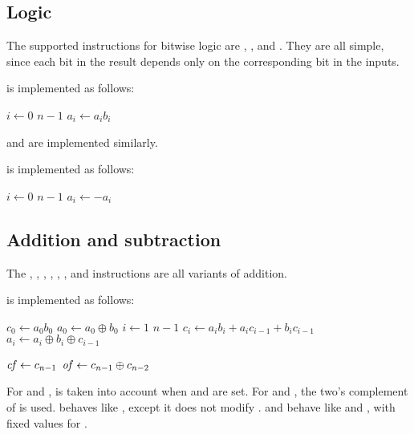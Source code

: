 \documentclass[a4paper,11pt]{kth-mag}
\renewcommand{\gets}{\leftarrow}
\newcommand{\AND}{}
\newcommand{\IOR}{+}
\newcommand{\XOR}{\oplus}
\newcommand{\NOT}{-}
\begin{document}

\subsection{Logic}

The supported instructions for bitwise logic are , ,  and .
They are all simple, since each bit in the result depends only on the corresponding bit in the inputs.

 is implemented as follows:

\begin{codebox}
\zi \For $i \gets 0$ \To $n-1$
\zi \Do
      $a_i \gets a_i \AND b_i$
    \End
\end{codebox}

 and  are implemented similarly.

 is implemented as follows:

\begin{codebox}
\zi \For $i \gets 0$ \To $n-1$
\zi \Do
      $a_i \gets \NOT a_i$
    \End
\end{codebox}

\subsection{Addition and subtraction}

The , , , , , ,  and  instructions are all variants of addition.

 is implemented as follows:

\begin{codebox}
\zi $c_0 \gets a_0 \AND b_0$
\zi $a_0 \gets a_0 \XOR b_0$
\zi \For $i \gets 1$ \To $n-1$
\zi \Do
      $c_i \gets a_i \AND b_i \IOR a_i \AND c_{i-1} \IOR b_i \AND c_{i-1}$
\zi   $a_i \gets a_i \XOR b_i \XOR c_{i-1}$
    \End
\end{codebox}

\begin{codebox}
\zi $\id{cf} \gets c_{n-1}$
\zi $\id{of} \gets c_{n-1} \XOR c_{n-2}$
\end{codebox}

For  and ,  is taken into account when  and  are set.
For  and , the two's complement of  is used.
 behaves like , except it does not modify .
 and  behave like  and , with fixed values for .
\end{document}
